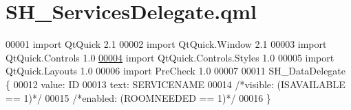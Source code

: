 \hypertarget{SH__ServicesDelegate_8qml}{\section{S\-H\-\_\-\-Services\-Delegate.\-qml}
\label{SH__ServicesDelegate_8qml}
}

\begin{DoxyCode}
00001 \textcolor{keyword}{import} QtQuick 2.1
00002 import QtQuick.Window 2.1
00003 import QtQuick.Controls 1.0
\hypertarget{SH__ServicesDelegate_8qml_source_l00004}{}\hyperlink{classSH__ServicesDelegate}{00004} import QtQuick.Controls.Styles 1.0
00005 import QtQuick.Layouts 1.0
00006 import PreCheck 1.0
00007 
00011 SH\_DataDelegate \{
00012     value: ID
00013     text: SERVICENAME
00014     \textcolor{comment}{/*visible: (ISAVAILABLE == 1)*/}
00015     \textcolor{comment}{/*enabled: (ROOMNEEDED == 1)*/}
00016 \}
\end{DoxyCode}

